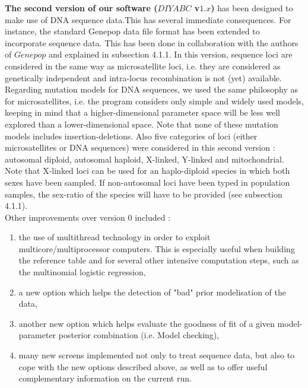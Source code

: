 \documentclass [a4paper]{report}
\begin{document}
\textbf{The second version of our software ($DIYABC$ v$1.x$)} has been designed to make use of DNA sequence data.This has several immediate consequences. For instance, the standard Genepop data file format has been extended to incorporate sequence data. This has been done in collaboration with the authors of $Genepop$ and explained in  subsection 4.1.1. In this version, sequence loci are considered in the same way as microsatellite loci, i.e. they are considered as genetically independent and intra-locus recombination is not (yet) available. Regarding mutation models for DNA sequences, we used the same philosophy as for microsatellites, i.e. the program considers only simple and widely used models, keeping in mind that a higher-dimensional parameter space will be less well explored than a lower-dimensional space. Note that none of these mutation models includes insertion-deletions. 
Also five categories of loci (either microsatellites or DNA sequences) were considered in this second version : autosomal diploid, autosomal haploid, X-linked, Y-linked and mitochondrial. Note that X-linked loci can be used for an haplo-diploid species in which both sexes have been sampled. If non-autosomal loci have been typed in population samples, the sex-ratio of the species will have to be provided (see subsection 4.1.1).\\ 



Other improvements over version 0 included :
\begin{enumerate}
\item the use of multithread technology in order to exploit multicore/multiprocessor computers. This is especially useful when building the reference table and for several other intensive computation steps, such as the multinomial logistic regression,
\item a new option which helps the detection of "bad" prior modelisation of the data, 
\item another new option which helps evaluate the goodness of fit of a given model-parameter posterior combination (i.e. Model checking),   
\item many new screens implemented not only to treat sequence data, but also to cope with the new options described above, as well as to offer useful complementary information on the current run. 

\end{enumerate}
\end{document}
